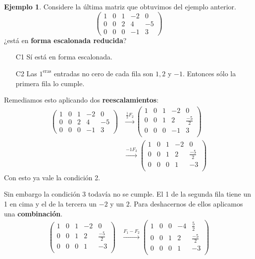 \documentclass[12pt]{article}
\theoremstyle{plain}
\theoremstyle{definition}
\newtheorem{Ex}[Th]{Ejemplo}           %
\theoremstyle{remark}
\renewcommand{\:}{\colon}           %
\newcommand{\half}{\frac12}
\begin{document}
\begin{multicols}{2}
\begin{Ex}
  Considere la última matriz que obtuvimos del ejemplo anterior.
  $$\begin{pmatrix}
    1&0&1&-2&0\\ 0&0&2&4&-5\\ 0&0&0&-1&3
  \end{pmatrix}$$
  ¿está en \textbf{forma escalonada reducida}?
  \begin{enumerate}
    \item[C1] Sí está en forma escalonada.
    \item[C2] Las $1^{\text{eras}}$ entradas no cero de cada fila son $1,2$ y $-1$. Entonces sólo la primera fila lo cumple.
  \end{enumerate}
  Remediamos esto aplicando dos \textbf{reescalamientos}:
  \begin{align*}
    \begin{pmatrix}
      1&0&1&-2&0\\ 0&0&2&4&-5\\ 0&0&0&-1&3
    \end{pmatrix}&\xrightarrow[]{\half F_2}\begin{pmatrix}
      1&0&1&-2&0\\ 0&0&1&2&\frac{-5}{2}\\ 0&0&0&-1&3\\
    \end{pmatrix}\\
      &\xrightarrow[]{-1 F_3}\begin{pmatrix}
        1&0&1&-2&0\\ 0&0&1&2&\frac{-5}{2}\\ 0&0&0&1&-3\\
    \end{pmatrix}
  \end{align*}
  Con esto ya vale la condición 2.\par Sin embargo la condición 3 todavía no se cumple. El 1 de la segunda fila tiene un 1 en cima y el de la tercera un $-2$ y un $2$. Para deshacernos de ellos aplicamos una \textbf{combinación}.
  \begin{align*}
    \begin{pmatrix}
        1&0&1&-2&0\\ 0&0&1&2&\frac{-5}{2}\\ 0&0&0&1&-3\\
    \end{pmatrix}&\xrightarrow[]{F_1-F_2} \begin{pmatrix}
      1&0&0&-4&\frac{5}{2}\\ 0&0&1&2&\frac{-5}{2}\\ 0&0&0&1&-3\\

\end{pmatrix}
\end{align*}
\end{Ex}
\end{multicols}
\end{document}
